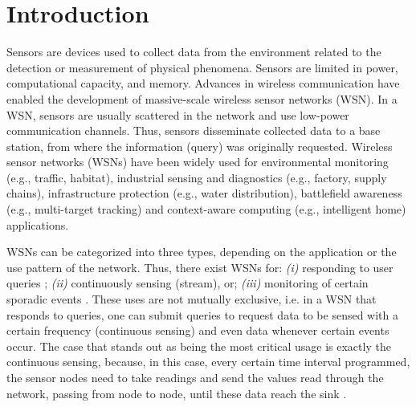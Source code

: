 \documentclass[conference]{IEEEtran}
\begin{document}
\section{Introduction}

Sensors are devices used to collect data from the environment related to the
detection or measurement of physical phenomena. Sensors are limited in power,
computational capacity, and memory. Advances in wireless communication have
enabled the development of massive-scale wireless sensor networks (WSN). In a
WSN, sensors are usually scattered in the network and use low-power
communication channels. Thus, sensors disseminate collected data to a base
station, from where the information (query) was originally requested. Wireless
sensor networks (WSNs) have been widely used for environmental monitoring (e.g.,
traffic, habitat), industrial sensing and diagnostics (e.g., factory, supply
chains), infrastructure protection (e.g., water distribution), battlefield
awareness (e.g., multi-target tracking) and context-aware computing (e.g.,
intelligent home) applications.

% 

WSNs can be categorized into three types, depending on the application or the
use pattern of the network. Thus, there exist WSNs for: {\it (i)} responding to
user queries \cite{Brayner2007}; {\it (ii)} continuously sensing (stream), or;
{\it (iii)} monitoring of certain sporadic events \cite{Ren2007}. These uses are
not mutually exclusive, i.e. in a WSN that responds to queries, one can submit
queries to request data to be sensed with a certain frequency (continuous
sensing) and even data whenever certain events occur. The case that stands out
as being the most critical usage is exactly the continuous sensing, because, in
this case, every certain time interval programmed, the sensor nodes need to take
readings and send the values read through the network, passing from node to
node, until these data reach the sink \cite{Villas2012}.
\end{document}
